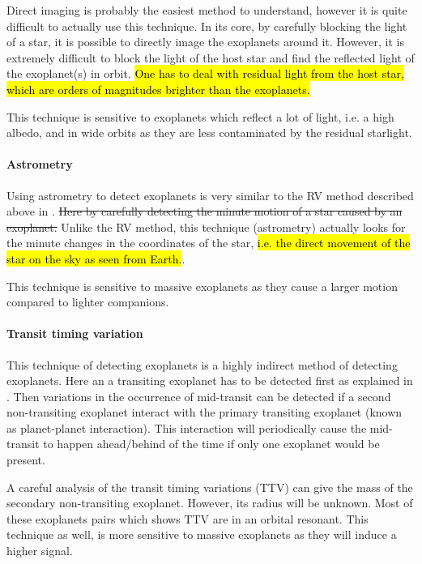 Direct imaging is probably the easiest method to understand, however it is quite difficult to
actually use this technique. In its core, by carefully blocking the light of a star, it is possible
to directly image the exoplanets around it. However, it is extremely difficult to block the light
of the host star and find the reflected light of the exoplanet(s) in orbit. \hl{One has to deal with
residual light from the host star, which are orders of magnitudes brighter than the exoplanets.}

This technique is sensitive to exoplanets which reflect a lot of light, i.e. a high albedo, and in
wide orbits as they are less contaminated by the residual starlight.

\paragraph{Astrometry}

Using astrometry to detect exoplanets is very similar to the RV method described above in
. \st{Here by carefully detecting the minute motion of a star caused by an
exoplanet.} Unlike the RV method, this technique (astrometry) actually looks for the minute changes
in the coordinates of the star, \hl{i.e. the direct movement of the star on the sky as seen from
Earth.}.

This technique is sensitive to massive exoplanets as they cause a larger motion compared to lighter
companions.


\paragraph{Transit timing variation}

This technique of detecting exoplanets is a highly indirect method of detecting exoplanets. Here an
a transiting exoplanet has to be detected first as explained in . Then
variations in the occurrence of mid-transit can be detected if a second non-transiting exoplanet
interact with the primary transiting exoplanet (known as planet-planet interaction). This
interaction will periodically cause the mid-transit to happen ahead/behind of the time if only one
exoplanet would be present.

A careful analysis of the transit timing variations (TTV) can give the mass of the secondary
non-transiting exoplanet. However, its radius will be unknown. Most of these exoplanets pairs which
shows TTV are in an orbital resonant. This technique as well, is more sensitive to massive
exoplanets as they will induce a higher signal.



